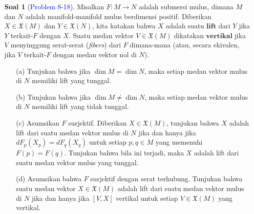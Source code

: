 \documentclass[11pt]{article}
\theoremstyle{definition}
\newtheorem*{problem}{Soal}
\theoremstyle{remark}
\begin{document}
\begin{problem}[\textcolor{blue}{Problem 8-18}]
Misalkan $F : M \to N$ adalah submersi mulus, dimana $M$ dan $N$ adalah manifold-manifold mulus berdimensi positif. Diberikan $X \in \mathfrak{X}(M)$ dan $Y \in \mathfrak{X}(N)$, kita katakan bahwa $X$ adalah suatu $\textbf{lift}$ dari $Y$ jika $Y$ terkait-$F$ dengan $X$. Suatu medan vektor $V \in \mathfrak{X}(M)$ dikatakan $\textbf{vertikal}$ jika $V$ menyinggung serat-serat (\textit{fibers}) dari $F$ dimana-mana (atau, secara ekivalen, jika $V$ terkait-$F$ dengan medan vektor nol di $N$). 
\begin{itemize}
    \item [(a)] Tunjukan bahwa jika $\dim M = \dim N$, maka setiap medan vektor mulus di $N$ memiliki lift yang tunggal.
    \item [(b)] Tunjukan bahwa jika $\dim M \neq \dim N$, maka setiap medan vektor mulus di $N$ memiliki lift yang tidak tunggal.
    \item [(c)] Asumsikan $F$ surjektif. Diberikan $X \in \mathfrak{X}(M)$, tunjukan bahwa $X$ adalah lift dari suatu medan vektor mulus di $N$ jika dan hanya jika $dF_p(X_p) = dF_q(X_q)$ untuk setiap $p,q \in M$ yang memenuhi $F(p)=F(q)$. Tunjukan bahwa bila ini terjadi, maka $X$ adalah lift dari suatu medan vektor mulus yang tunggal.
    \item [(d)] Asumsikan bahwa $F$ surjektif dengan serat terhubung. Tunjukan bahwa suatu medan vektor $X \in \mathfrak{X}(M)$ adalah lift dari suatu medan vektor mulus di $N$ jika dan hanya jika $[V,X]$ vertikal untuk setiap $V \in \mathfrak{X}(M)$ yang vertikal.
\end{itemize}
\end{problem}
\end{document}
